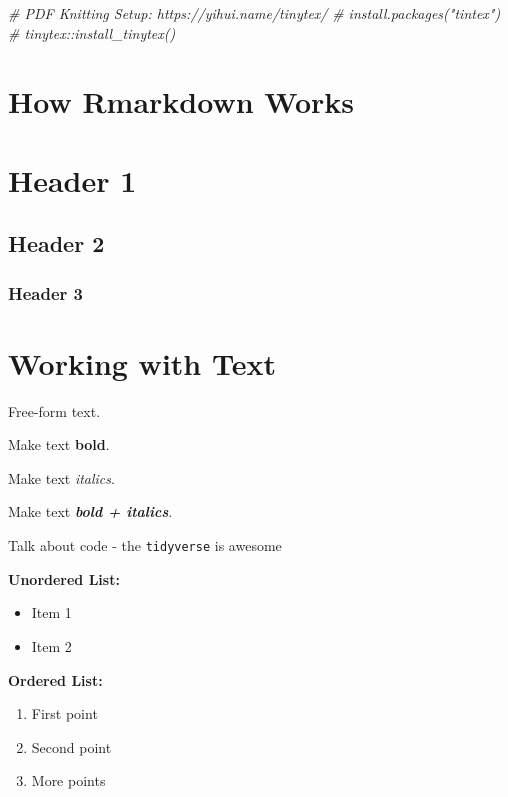 \documentclass[
]{article}
\newenvironment{Shaded}{\begin{snugshade}}{\end{snugshade}}
\newcommand{\CommentTok}[1]{\textcolor[rgb]{0.56,0.35,0.01}{\textit{#1}}}
\begin{document}
\begin{Shaded}
\begin{Highlighting}[]
\CommentTok{\# PDF Knitting Setup: https://yihui.name/tinytex/ }
\CommentTok{\# install.packages("tintex")}
\CommentTok{\# tinytex::install\_tinytex()}
\end{Highlighting}
\end{Shaded}

\hypertarget{how-rmarkdown-works}{%
\section{How Rmarkdown Works}\label{how-rmarkdown-works}}

\hypertarget{header-1}{%
\section{Header 1}\label{header-1}}

\hypertarget{header-2}{%
\subsection{Header 2}\label{header-2}}

\hypertarget{header-3}{%
\subsubsection{Header 3}\label{header-3}}

\hypertarget{working-with-text}{%
\section{Working with Text}\label{working-with-text}}

Free-form text.

Make text \textbf{bold}.

Make text \emph{italics}.

Make text \textbf{\emph{bold + italics}}.

Talk about code - the \texttt{tidyverse} is awesome

\textbf{Unordered List:}

\begin{itemize}
\item
  Item 1
\item
  Item 2
\end{itemize}

\textbf{Ordered List:}

\begin{enumerate}
\def\labelenumi{\arabic{enumi}.}
\item
  First point
\item
  Second point
\item
  More points
\end{enumerate}
\end{document}
